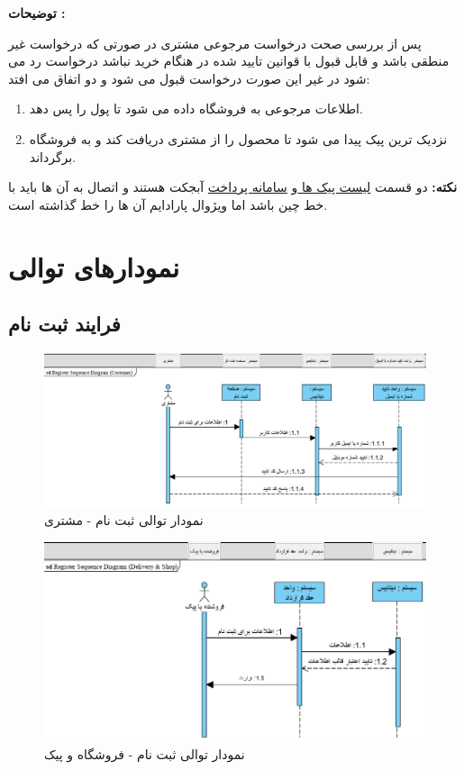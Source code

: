 \documentclass[12pt,a4paper]{article}
\begin{document}
	\textbf{توضیحات :} 
	
	
	پس از بررسی صحت درخواست مرجوعی مشتری در صورتی که درخواست غیر منطقی باشد و قابل قبول با قوانین تایید شده در هنگام خرید نباشد درخواست رد می شود در غیر این صورت درخواست قبول می شود و دو اتفاق می افتد:
	\begin{enumerate}
		\item
		اطلاعات مرجوعی به فروشگاه داده می شود تا پول را پس دهد.
		\item
		نزدیک ترین پیک پیدا می شود تا محصول را از مشتری دریافت کند و به فروشگاه برگرداند.
	\end{enumerate}
	\textbf{نکته: }دو قسمت \underline{لیست پیک ها }و \underline{سامانه پرداخت} آبجکت هستند و اتصال به آن ها باید با خط چین باشد اما ویژوال پارادایم آن ها را خط گذاشته است.
	
\pagebreak

\section{نمودارهای توالی} \label{section.sequence}

	
	\subsection{فرایند ثبت نام} \label{section.sequence.register}
		\begin{figure}[h!]
			\begin{center}
				\includegraphics[width=12cm]{images/Register Sequence Diagram (Customer).png}
			\end{center}
			\caption{نمودار توالی ثبت نام - مشتری}
		\end{figure}
		
		\begin{figure}[h!]
			\begin{center}
				\includegraphics[width=12cm]{images/Register Sequence Diagram (Delivery & Shop).png}
			\end{center}
			\caption{نمودار توالی ثبت نام - فروشگاه و پیک}
		\end{figure}
		
\end{document}
